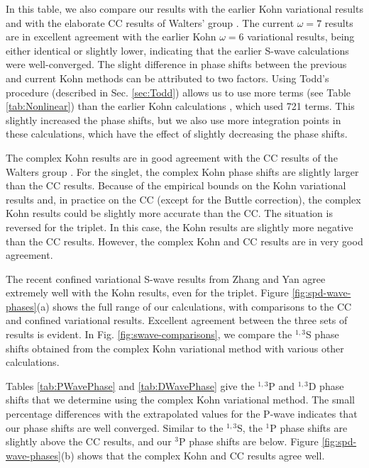 \documentclass[preprint,showpacs,preprintnumbers,amsmath,amssymb]{revtex4}
\begin{document}
In this table, we also compare our results with the earlier Kohn variational results \cite{VanReeth2003,VanReeth2004} and with the elaborate CC results of Walters' group \cite{Blackwood2002,Walters2004}. The current $\omega = 7$ results are in excellent agreement with the earlier Kohn $\omega = 6$ variational results, being either identical or slightly lower, indicating that the earlier S-wave calculations were well-converged. The slight difference in phase shifts between the previous and current Kohn methods can be attributed to two factors. Using Todd's procedure (described in Sec. \ref{sec:Todd}) allows us to use more terms (see Table \ref{tab:Nonlinear}) than the earlier Kohn calculations \cite{VanReeth2003,VanReeth2004}, which used 721 terms. This slightly increased the phase shifts, but we also use more integration points in these calculations, which have the effect of slightly decreasing the phase shifts.

The complex Kohn results are in good agreement with the CC results of the Walters group \cite{Blackwood2002,Walters2004}. For the singlet, the complex Kohn phase shifts are slightly larger than the CC results. Because of the empirical bounds on the Kohn variational results and, in practice on the CC (except for the Buttle correction), the complex Kohn results could be slightly more accurate than the CC.
The situation is reversed for the triplet. In this case, the Kohn results are slightly more negative than the CC results. However, the complex Kohn and CC results are in very good agreement.

The recent confined variational S-wave results from Zhang and Yan \cite{Zhang2012} agree extremely well with the Kohn results, even for the triplet. Figure \ref{fig:spd-wave-phases}(a) shows the full range of our calculations, with comparisons to the CC and confined variational results. Excellent agreement between the three sets of results is evident. In Fig. \ref{fig:swave-comparisons}, we compare the $^{1,3}$S phase shifts obtained from the complex Kohn variational method with various other calculations.

Tables \ref{tab:PWavePhase} and \ref{tab:DWavePhase} give the $^{1,3}$P and $^{1,3}$D phase shifts that we determine using the complex Kohn variational method. The small percentage differences with the extrapolated values for the P-wave indicates that our phase shifts are well converged. Similar to the $^{1,3}$S, the $^1$P phase shifts are slightly above the CC results, and our $^3$P phase shifts are below. Figure \ref{fig:spd-wave-phases}(b) shows that the complex Kohn and CC results agree well.
\end{document}
